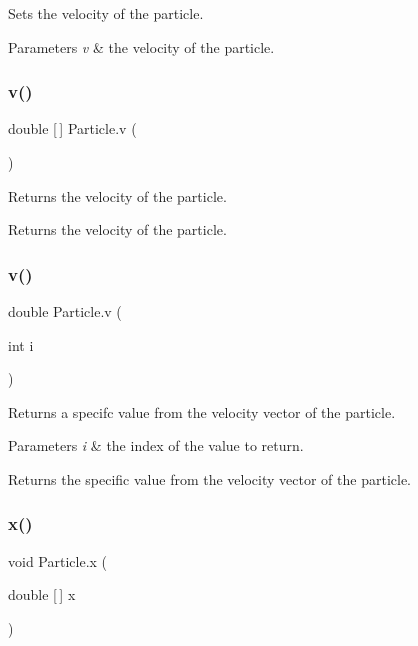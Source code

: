 Sets the velocity of the particle. 
\begin{DoxyParams}{Parameters}
{\em v} & the velocity of the particle. \\
\hline
\end{DoxyParams}
\mbox{\label{class_particle_a82665a73d72400706763a8fe62a4b677}} 
\subsubsection{\texorpdfstring{v()}{v()}\hspace{0.1cm}{\footnotesize\ttfamily [2/3]}}
{\footnotesize\ttfamily double \mbox{[}$\,$\mbox{]} Particle.\+v (\begin{DoxyParamCaption}{ }\end{DoxyParamCaption})}

Returns the velocity of the particle. \begin{DoxyReturn}{Returns}
the velocity of the particle. 
\end{DoxyReturn}
\mbox{\label{class_particle_aa7e430520821b6650d829f3b51752d01}} 
\subsubsection{\texorpdfstring{v()}{v()}\hspace{0.1cm}{\footnotesize\ttfamily [3/3]}}
{\footnotesize\ttfamily double Particle.\+v (\begin{DoxyParamCaption}\item[{int}]{i }\end{DoxyParamCaption})}

Returns a specifc value from the velocity vector of the particle. 
\begin{DoxyParams}{Parameters}
{\em i} & the index of the value to return. \\
\hline
\end{DoxyParams}
\begin{DoxyReturn}{Returns}
the specific value from the velocity vector of the particle. 
\end{DoxyReturn}
\mbox{\label{class_particle_a421fd391e44a79cc2a32cfe635ab9df3}} 
\subsubsection{\texorpdfstring{x()}{x()}\hspace{0.1cm}{\footnotesize\ttfamily [1/3]}}
{\footnotesize\ttfamily void Particle.\+x (\begin{DoxyParamCaption}\item[{double \mbox{[}$\,$\mbox{]}}]{x }\end{DoxyParamCaption})}

